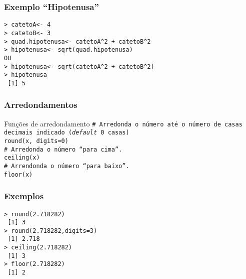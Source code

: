 \documentclass{beamer}
\begin{document}
\begin{frame}
  \frametitle{Exemplo ``Hipotenusa''}
\texttt{> catetoA<- 4\\
> catetoB<- 3\\ \pause 
> quad.hipotenusa<- catetoA\^{}2 + catetoB\^{}2\\
> hipotenusa<- sqrt(quad.hipotenusa)\\ \vspace{10pt}\pause
OU \vspace{10pt}\\
> hipotenusa<- sqrt(catetoA\^{}2 + catetoB\^{}2)\\
> hipotenusa\\
~[1] 5}
\end{frame}
\begin{frame}
  \frametitle{Arredondamentos}
  \begin{block}{Funções de arredondamento}
\texttt{\# Arredonda o número até o número de casas decimais indicado (\textit{default} 0 casas)\\
round(x, digits=0)\\ \vspace{10pt}
\# Arredonda o número ``para  cima''.\\
ceiling(x)\\ \vspace{10pt}
\# Arrendonda o número ``para baixo''.\\
floor(x)}
  \end{block}
\end{frame}

\begin{frame}
\frametitle{Exemplos}
\texttt{> round(2.718282)\\
~[1] 3\\ \vspace{10pt}
> round(2.718282,digits=3)\\
~[1] 2.718\\ \vspace{10pt}
> ceiling(2.718282)\\
~[1] 3\\ \vspace{10pt}
> floor(2.718282)\\
~[1] 2}
  
\end{frame}
\end{document}
